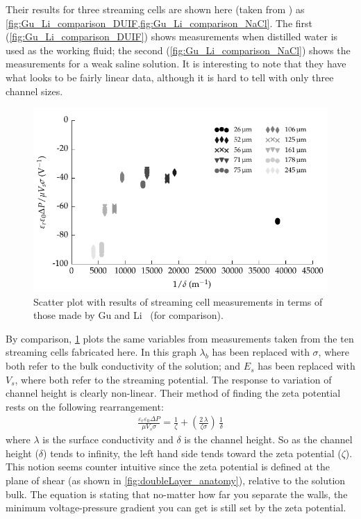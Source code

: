   Their results for three streaming cells are shown here (taken from \cite{Gu2000}) as \cref{fig:Gu_Li_comparison_DUIF,fig:Gu_Li_comparison_NaCl}.
  The first (\cref{fig:Gu_Li_comparison_DUIF}) shows measurements when distilled water is used as the working fluid; the second (\cref{fig:Gu_Li_comparison_NaCl}) shows the measurements for a weak saline solution.
  It is interesting to note that they have what looks to be fairly linear data, although it is hard to tell with only three channel sizes.

  \begin{figure}
      \centering
      \includegraphics{content/pt1/01-PowerHarvesting/graphics/graph_streamingComparison_gu}
      \caption{\label{fig:streamingCell_scatter_Gu_Li}Scatter plot with results of streaming cell measurements in terms of those made by Gu and Li~\cite{Gu2000} (for comparison).}
  \end{figure}

  By comparison, \cref{fig:streamingCell_scatter_Gu_Li} plots the same variables from measurements taken from the ten streaming cells fabricated here.
  In this graph $\lambda_{b}$ has been replaced with $\sigma$, where both refer to the bulk conductivity of the solution; and $E_{s}$ has been replaced with $V_{s}$, where both refer to the streaming potential.
  The response to variation of channel height is clearly non-linear.
  Their method of finding the zeta potential rests on the following rearrangement:
  \begin{eqnarray}
      \frac{\varepsilon_{r}\varepsilon_{0}\Delta P}{\mu V_{s}\sigma} = \frac{1}{\zeta} + \left( \frac{2\,\lambda}{\zeta \sigma}\right)\,\frac{1}{\delta}
  \end{eqnarray}
  where $\lambda$ is the surface conductivity and $\delta$ is the channel height.
  So as the channel height ($\delta$) tends to infinity, the left hand side tends toward the zeta potential ($\zeta$).
  This notion seems counter intuitive since the zeta potential is defined at the plane of shear (as shown in \cref{fig:doubleLayer_anatomy}), relative to the solution bulk.
  The equation is stating that no-matter how far you separate the walls, the minimum voltage-pressure gradient you can get is still set by the zeta potential.

